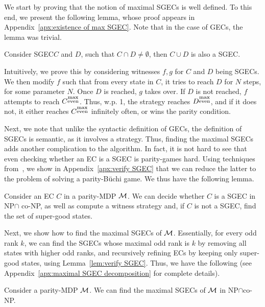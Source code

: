 \documentclass[runningheads,a4paper]{llncs}
\newcommand{\M}{{\cal M}}
\newcommand{\buchi}{B\"uchi\xspace}
\newcommand{\sgec}{{SGEC}\xspace}
\newcommand{\gecs}{{GECs}\xspace}
\newcommand{\sgecs}{{SGECs}\xspace}
\newcommand{\me}{{\substack{\rm max\\ \rm even}}}
\begin{document}
We start by proving that the notion of maximal \sgecs is well defined. 
To this end, we present the following lemma, whose proof appears in Appendix~\ref{apx:existence of max SGEC}. Note that in the case of \gecs, the lemma was trivial.
\vspace*{-5pt}
\begin{lemma}
\label{lem:existence of max SGEC}
Consider \sgec $C$ and $D$, such that $C\cap D\neq \emptyset$, then $C\cup D$ is also a \sgec.
\end{lemma}
\vspace*{-5pt}
Intuitively, we prove this by considering witnesses $f,g$ for $C$ and $D$ being \sgecs. We then modify $f$ such that from every state in $C$, it tries to reach $D$ for $N$ steps, for some parameter $N$. Once $D$ is reached, $g$ takes over. If $D$ is not reached, $f$ attempts to reach $C^{\me}$. Thus, w.p. 1, the strategy reaches $D^\me$, and if it does not, it either reaches $C^\me$ infinitely often, or wins the parity condition.

Next, we note that unlike the syntactic definition of \gecs, the definition of \sgecs is semantic, as it involves a strategy. Thus, finding the maximal \sgecs adds another complication to the algorithm. In fact, it is not hard to see that even checking whether an EC is a \sgec is parity-games hard. Using techniques from~\cite{CD11}, we show in Appendix~\ref{apx:verify SGEC} that we can reduce the latter to the problem of solving a parity-\buchi game. 
We thus have the following lemma.
\vspace*{-5pt}
\begin{lemma}
\label{lem:verify SGEC}
Consider an EC $C$ in a parity-MDP $\M$. We can decide whether $C$ is a \sgec in NP$\cap$ co-NP, as well as compute a witness strategy and, if $C$ is not a \sgec, find the set of super-good states.
\end{lemma}
\vspace*{-5pt}




Next, we show how to find the maximal \sgecs of $\M$. Essentially, for every odd rank $k$, we can find the \sgecs whose maximal odd rank is $k$ by removing all states with higher odd ranks, and recursively refining ECs by keeping only super-good states, using Lemma~\ref{lem:verify SGEC}. Thus, we have the following (see Appendix~\ref{apx:maximal SGEC decomposition} for complete details).
\vspace*{-5pt}
\begin{theorem}
\label{thm:maximal SGEC decomposition}
Consider a parity-MDP $\M$. We can find the maximal \sgecs of $\M$ in NP$\cap$co-NP.
\end{theorem}
\vspace*{-5pt}
\end{document}
